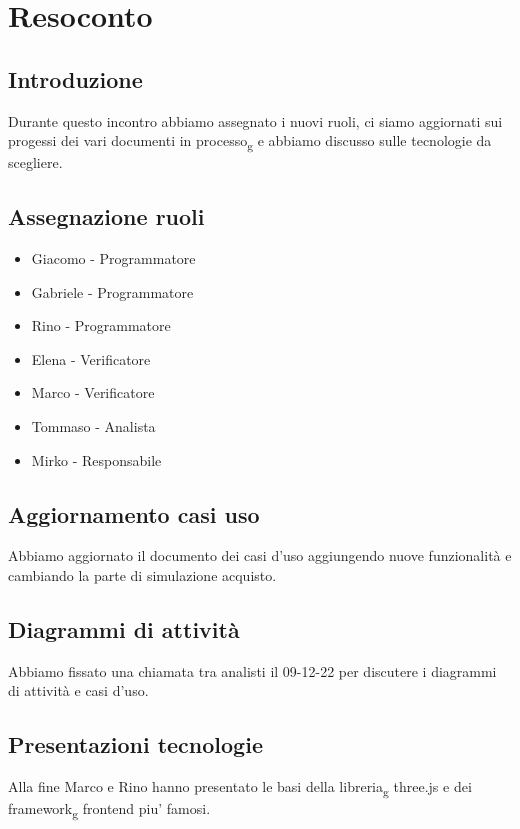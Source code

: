 \section{Resoconto}
\subsection{Introduzione}
Durante questo incontro abbiamo assegnato i nuovi ruoli, ci siamo aggiornati sui progessi dei vari documenti in processo\textsubscript{g} e abbiamo discusso sulle tecnologie da scegliere.

\subsection{Assegnazione ruoli}
\begin{itemize}
	\item Giacomo - Programmatore
	\item Gabriele - Programmatore 
	\item Rino - Programmatore
	\item Elena - Verificatore
	\item Marco - Verificatore
	\item Tommaso - Analista
	\item Mirko - Responsabile
\end{itemize}

\subsection{Aggiornamento casi uso}
Abbiamo aggiornato il documento dei casi d'uso aggiungendo nuove funzionalità e cambiando la parte di simulazione acquisto.

\subsection{Diagrammi di attività}
Abbiamo fissato una chiamata tra analisti il 09-12-22 per discutere i diagrammi di attività  e casi d’uso.

\subsection{Presentazioni tecnologie}
Alla fine Marco e Rino hanno presentato le basi della libreria\textsubscript{g} three.js e dei framework\textsubscript{g} frontend piu' famosi.

